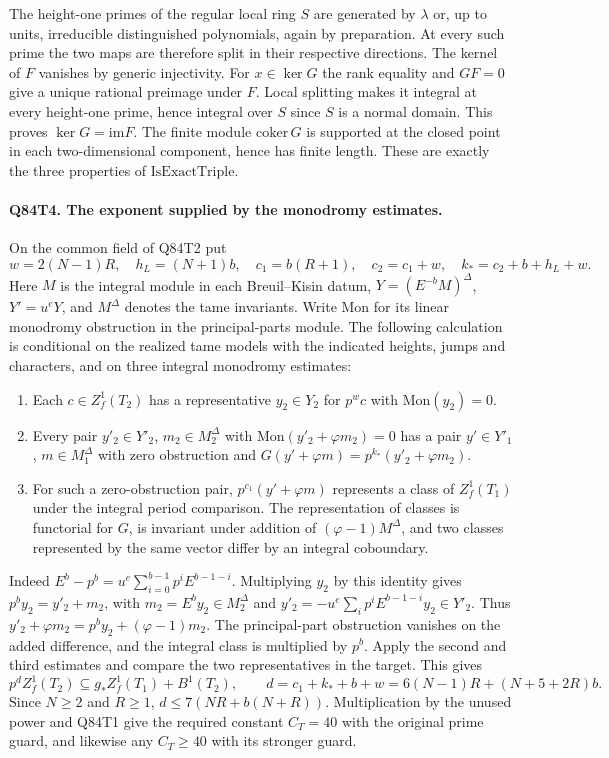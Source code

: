 The height-one primes of the regular local ring $S$ are generated by
$\lambda$ or, up to units, irreducible distinguished polynomials,
again by preparation. At every such prime the two maps are therefore
split in their respective directions. The kernel of $F$ vanishes
by generic injectivity. For $x\in\ker G$ the rank equality and
$GF=0$ give a unique rational preimage under $F$. Local splitting
makes it integral at every height-one prime, hence integral over
$S$ since $S$ is a normal domain. This proves $\ker G=\mathrm{im}F$.
The finite module $\mathrm{coker}\,G$ is supported at the closed
point in each two-dimensional component, hence has finite length.
These are exactly the three properties of $\mathrm{IsExactTriple}$.

\paragraph{Q84T4. The exponent supplied by the monodromy estimates.}
On the common field of Q84T2 put
\[
 w=2(N-1)R,\quad h_L=(N+1)b,\quad c_1=b(R+1),\quad
 c_2=c_1+w,\quad k_*=c_2+b+h_L+w.
\]
Here $M$ is the integral module in each Breuil--Kisin datum,
$Y=(E^{-b}M)^\Delta$, $Y'=u^eY$, and $M^\Delta$ denotes the tame
invariants. Write $\mathrm{Mon}$ for its linear monodromy obstruction
in the principal-parts module. The following calculation is conditional
on the realized tame models with the indicated heights, jumps and
characters, and on three integral monodromy estimates:
\begin{enumerate}
\item Each $c\in Z_f^1(T_2)$ has a representative $y_2\in Y_2$ for
$p^w c$ with $\mathrm{Mon}(y_2)=0$.
\item Every pair $y'_2\in Y'_2$, $m_2\in M_2^\Delta$ with
$\mathrm{Mon}(y'_2+\varphi m_2)=0$ has a pair
$y'\in Y'_1$, $m\in M_1^\Delta$ with zero obstruction and
$G(y'+\varphi m)=p^{k_*}(y'_2+\varphi m_2)$.
\item For such a zero-obstruction pair, $p^{c_1}(y'+\varphi m)$
represents a class of $Z_f^1(T_1)$ under the integral period
comparison. The representation of classes is functorial for $G$,
is invariant under addition of $(\varphi-1)M^\Delta$, and two
classes represented by the same vector differ by an integral coboundary.
\end{enumerate}
Indeed $E^b-p^b=u^e\sum_{i=0}^{b-1}p^i E^{b-1-i}$. Multiplying
$y_2$ by this identity gives $p^b y_2=y'_2+m_2$, with
$m_2=E^b y_2\in M_2^\Delta$ and
$y'_2=-u^e\sum_i p^iE^{b-1-i}y_2\in Y'_2$.
Thus $y'_2+\varphi m_2=p^b y_2+(\varphi-1)m_2$. The principal-part
obstruction vanishes on the added difference, and the integral class
is multiplied by $p^b$. Apply the second and third estimates and compare
the two representatives in the target. This gives
\[
 p^dZ_f^1(T_2)\subseteq g_*Z_f^1(T_1)+B^1(T_2),\qquad
 d=c_1+k_*+b+w=6(N-1)R+(N+5+2R)b.
\]
Since $N\ge2$ and $R\ge1$, $d\le7(NR+b(N+R))$.
Multiplication by the unused power and Q84T1 give the required
constant $C_T=40$ with the original prime guard, and likewise any
$C_T\ge40$ with its stronger guard.

